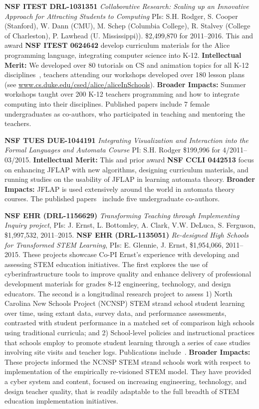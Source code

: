\documentclass[11pt]{article}
\begin{document}
\medskip

\textbf{NSF ITEST DRL-1031351}
\emph{Collaborative Research: Scaling up an Innovative Approach for
Attracting Students to Computing} 
PIs: S.H. Rodger, S. Cooper (Stanford),
W. Dann (CMU), M. Schep (Columbia College), 
R. Stalvey (College of Charleston), P. Lawhead (U. Mississippi)). 
\$2,499,870 for 2011--2016.
This and award {\bf NSF ITEST 0624642} develop curriculum
materials for the Alice programming language, integrating computer
science into K-12.
\textbf{Intellectual Merit:}
We developed over 80 tutorials on CS and animation
topics for all K-12 disciplines~\cite{CDL11,RDG12},
teachers attending our workshops developed over 180 lesson plans
(see \url{www.cs.duke.edu/csed/alice/aliceInSchools}).
\textbf{Broader Impacts:} Summer workshops taught over 200 K-12
teachers programming and how to integrate computing into their
disciplines.
Published papers include 7 female undergraduates as co-authors, who
participated in teaching and mentoring the teachers.

\textbf{NSF TUES DUE-1044191}
\emph{Integrating Visualization and Interaction into the Formal
Languages and Automata Course}
PI: S.H. Rodger
\$199,996 for 4/2011-- 03/2015.
\textbf{Intellectual Merit:}
This and prior award {\bf NSF CCLI 0442513} focus on enhancing
JFLAP with new algorithms, designing curriculum materials, and running
studies on the usability of JFLAP in learning automata theory.
\textbf{Broader Impacts:}
JFLAP is used extensively around the world in automata theory courses.
The published papers~\cite{RWL09,RQS11} include five
undergraduate co-authors.

\medskip

\textbf{NSF EHR (DRL-1156629)}
\emph{Transforming Teaching through Implementing Inquiry project},
PIs: J. Ernst, L. Bottomley, A. Clark, V.W. DeLuca, S. Ferguson,
\$1,997,532, 2011--2015.
\textbf{NSF EHR (DRL-1135051)}
\emph{Re-designed High Schools for Transformed STEM Learning},
PIs: E. Glennie, J. Ernst, \$1,954,066, 2011--2015.
These projects showcase Co-PI Ernst's experience with developing and
assessing STEM education initiatives.
The first explores the use of cyberinfrastructure tools to improve
quality and enhance delivery of professional development materials for
grades 8-12 engineering, technology, and design educators.
The second is a longitudinal research project to assess
1) North Carolina New Schools Project (NCNSP) STEM strand school
student learning over time, using extant data, survey data, and
performance assessments, contrasted with student performance in a
matched set of comparison high schools using traditional curricula;
and
2) School-level policies and instructional practices that
schools employ to promote student learning through a series of case
studies involving site visits and teacher logs.
Publications include~\cite{Ernst12,Ernst13,Segedin13}.
\textbf{Broader Impacts:} These projects informed the NCNSP STEM
strand schools work with respect to implementation of the empirically
re-visioned STEM model. They have provided a cyber system and content,
focused on increasing engineering, technology, and design teacher
quality, that is readily adaptable to the full breadth of STEM
education implementation initiatives. 

%

\newpage
\pagestyle{empty}


\end{document}
